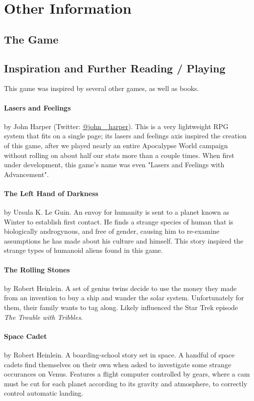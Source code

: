 \section{Other Information}

\subsection{The Game}

\subsection{Inspiration and Further Reading / Playing}
\par
This game was inspired by several other games, as well as books.

\paragraph{Lasers and Feelings}
by John Harper (Twitter: \href{https://twitter.com/john_harper/}{@john\_ harper}). This is a very lightweight RPG system that fits on a single page; its lasers and feelings axis inspired the creation of this game, after we played nearly an entire Apocalypse World campaign without rolling on about half our stats more than a couple times. When first under development, this game's name was even "Lasers and Feelings with Advancement".

\paragraph{The Left Hand of Darkness}
by Ursula K. Le Guin. An envoy for humanity is sent to a planet known as Winter to establish first contact. He finds a strange species of human that is biologically androgynous, and free of gender, causing him to re-examine assumptions he has made about his culture and himself. This story inspired the strange types of humanoid aliens found in this game.

\paragraph{The Rolling Stones}
by Robert Heinlein. A set of genius twins decide to use the money they made from an invention to buy a ship and wander the solar system. Unfortunately for them, their family wants to tag along. Likely influenced the Star Trek episode \textit{The Trouble with Tribbles}.

\paragraph{Space Cadet}
by Robert Heinlein. A boarding-school story set in space. A handful of space cadets find themselves on their own when asked to investigate some strange occurances on Venus. Features a flight computer controlled by gears, where a cam must be cut for each planet according to its gravity and atmosphere, to correctly control automatic landing.

